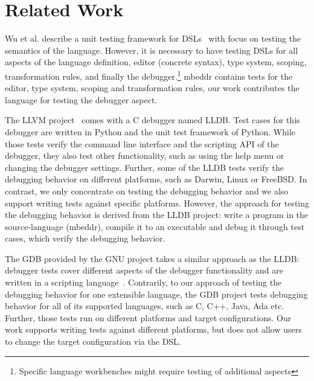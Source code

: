 \section{Related Work}

Wu et al. describe a unit testing framework for 
\acp{DSL}~\cite{DBLP:conf/dsl/WuGM09} with focus on
testing the semantics of the language.  However, it is necessary to have
testing \acp{DSL} for all aspects of the language definition, \eg editor
(concrete syntax), type system, scoping, transformation rules, and finally the
debugger.\footnote{Specific language workbenches might require testing of additional aspects}
mbeddr contains tests for the editor, type system, scoping and transformation
rules, our work contributes the language for testing the debugger aspect.

The \ac{LLVM} project~\cite{LLDB} comes with a C debugger named \ac{LLDB}.
Test cases for this debugger are written in Python
and the unit test framework of Python. While those tests verify the 
command line interface and the scripting \ac{API} of the debugger, they also
test other functionality, such as using the help menu or changing the debugger settings.
Further, some of the \ac{LLDB} tests verify the debugging behavior on different
platforms, such as Darwin, Linux or FreeBSD. In contrast, we only concentrate on
testing the debugging behavior and we also support writing tests against
specific platforms. However, the approach for testing the debugging behavior is
derived from the \ac{LLDB} project: write a program in the source-language (mbeddr),
compile it to an executable and debug it through test cases, which verify the
debugging behavior.

The \ac{GDB} provided by the GNU project takes a similar approach as
the \ac{LLDB}: debugger tests cover different aspects of the debugger
functionality and are written in a scripting language~\cite{gdb}.
Contrarily, to our approach of testing the debugging behavior 
for one extensible language, the \ac{GDB} project tests
debugging behavior for all of its supported languages, such as C, C++, Java, Ada
etc. Further, those tests run on different platforms and target
configurations. Our work supports writing tests against different platforms, but
does not allow users to change the target configuration via the \ac{DSL}.

